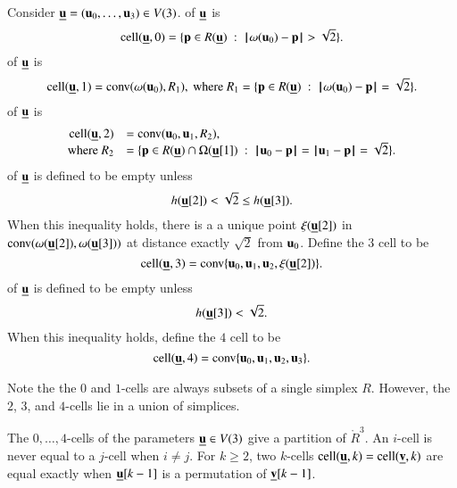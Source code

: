 \begin{definition} Consider $\bu=( \u_0,\ldots, \u_3)\in  V(3)$.
\hfill\break\smallskip  
{} of $\bu$ is
\begin{displaymath}
\cell(\bu,0) = \{\p\in R(\bu) \mid \norm{\omega( \u_0)}{\p} > \sqrt2\}.
\end{displaymath}
\bigskip
{} of $\bu$ is 
\begin{displaymath}
\cell(\bu,1) = \op{conv}(\omega( \u_0),R_1),\hbox{ where } R_1 = \{\p \in R(\bu) \mid \norm{\omega( \u_0)}{\p}= \sqrt2\}.
\end{displaymath}
%
%
%
\bigskip
{} of $\bu$ is
\begin{displaymath}
\begin{array}{rll}
\cell(\bu,2) &= \op{conv}( \u_0, \u_1,R_2),\quad \\
 \text{where } R_2 &= \{\p \in R(\bu)\cap \Omega(\bu[1]) \mid \norm{ \u_0}{\p}=\norm{ \u_1}{\p} =\sqrt2\}.
\end{array}
\end{displaymath}
\bigskip
{} of $\bu$ is defined to be empty unless 
\begin{displaymath}
h(\bu[2]) <\sqrt2 \le h(\bu[3]).
\end{displaymath}
When this inequality holds,
there is a a unique point $\xi(\bu[2])$ in
$\op{conv}(\omega(\bu[2]),\omega(\bu[3]))$ at distance exactly $\sqrt2$ from $ \u_0$.  
Define the $3$ cell to be
\begin{displaymath}
\cell(\bu,3) = \op{conv}\{ \u_0, \u_1, \u_2,\xi(\bu[2])\}.
\end{displaymath}
\bigskip
{} of $\bu$ is defined to be empty unless
\begin{displaymath}
h(\bu[3]) <\sqrt2.
\end{displaymath}
When this inequality holds, define the $4$ cell to be
\begin{displaymath}
\cell(\bu,4) = \op{conv}\{ \u_0, \u_1, \u_2, \u_3\}.
\end{displaymath}
\end{definition}
%

Note the the $0$ and $1$-cells are always subsets of a single simplex $R$.  However, the $2$, $3$, and
$4$-cells lie in a union of  simplices.

\begin{lemma}  The $0,\ldots,4$-cells of the parameters $\bu\in  V(3)$
give a partition of $\ring{R}^3$.  An $i$-cell is never equal to a $j$-cell when $i\ne j$. For $k\ge 2$, 
two $k$-cells $\cell(\bu,k)=\cell(\bv,k)$ are equal exactly when $\bu[k-1]$
is a permutation of $\bv[k-1]$.
\end{lemma}

